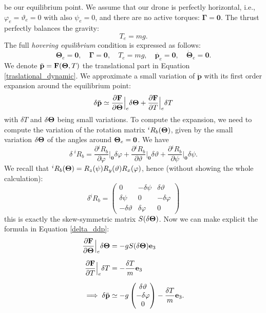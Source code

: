\documentclass[10pt, a4paper]{report}
\begin{document}
be our equilibrium point.
We assume that our drone is perfectly horizontal, i.e., $\varphi_e=\vartheta_e=0$ with also $\psi_e=0$, and there are no active torques: $\boldsymbol{\Gamma}=\mathbf 0$. The thrust perfectly balances the gravity:\begin{equation}
    T_e=mg.
\end{equation}
The full \textit{hovering equilibrium} condition is expressed as follows:\begin{equation}
    \boldsymbol{\Theta}_e=\mathbf 0,\quad 
    \boldsymbol{\Gamma}=\mathbf 0,\quad 
    T_e=mg,\quad 
    \dot{\mathbf p_e}=\mathbf 0,\quad 
    \dot{\boldsymbol{\Theta}}_e=\mathbf 0.
\end{equation}
We denote $\ddot{\mathbf p}=\mathbf F({\boldsymbol{\Theta}},T)$ the translational part in Equation \eqref{traslational_dynamic}.
We approximate a small variation of $\ddot{\mathbf p}$ with its first order expansion around the equilibrium point:\begin{equation}\label{delta_ddp}
    \delta\ddot{\mathbf p}\simeq \frac{\partial\mathbf F}{\partial{\boldsymbol{\Theta}}}\Big|_e\delta{\boldsymbol{\Theta}}+\frac{\partial\mathbf F}{\partial T}\Big|_e\delta T
\end{equation}
with $\delta T$ and $\delta{\boldsymbol{\Theta}}$ being small variations. 
To compute the expansion, we need to compute the variation of the rotation matrix ${}^iR_b({\boldsymbol{\Theta}})$, given by the small variation $\delta{\boldsymbol{\Theta}}$ of the angles around ${\boldsymbol{\Theta}}_e=\mathbf 0$. We have\begin{equation}
    \delta\ {}^iR_b=\frac{\partial {}^iR_b}{\partial\varphi}\Big|_{\mathbf 0}\delta\varphi+
    \frac{\partial {}^iR_b}{\partial\vartheta}\Big|_{\mathbf 0}\delta\vartheta+
    \frac{\partial {}^iR_b}{\partial\psi}\Big|_{\mathbf 0}\delta\psi.
\end{equation}
We recall that ${}^iR_b({\boldsymbol{\Theta}})=R_z(\psi)R_y(\vartheta)R_x(\varphi)$, hence (without showing the whole calculation):\begin{equation}
    \delta {}^iR_b=\begin{pmatrix}
        0&-\delta\psi&\delta\vartheta\\ 
        \delta\psi&0&-\delta\varphi\\ 
        -\delta\vartheta&\delta\varphi&0 
    \end{pmatrix}
\end{equation}
this is exactly the skew-symmetric matrix $S(\delta{\boldsymbol{\Theta}})$. Now we can make explicit the formula in Equation \eqref{delta_ddp}:\begin{align}
    \frac{\partial\mathbf F}{\partial{\boldsymbol{\Theta}}}\Big|_e\delta{\boldsymbol{\Theta}}&=-gS(\delta{\boldsymbol{\Theta}})\mathbf e_3\\[1.5ex]
    \frac{\partial\mathbf F}{\partial T}\Big|_e\delta T&=-\frac{\delta T}{m}\mathbf e_3\\[1.5ex]
    \implies 
     \delta\ddot{\mathbf p}&\simeq -g\begin{pmatrix}
        \delta\vartheta\\-\delta\varphi\\0 
     \end{pmatrix}-\frac{\delta T}{m}\mathbf e_3.
\end{align}
\end{document}

